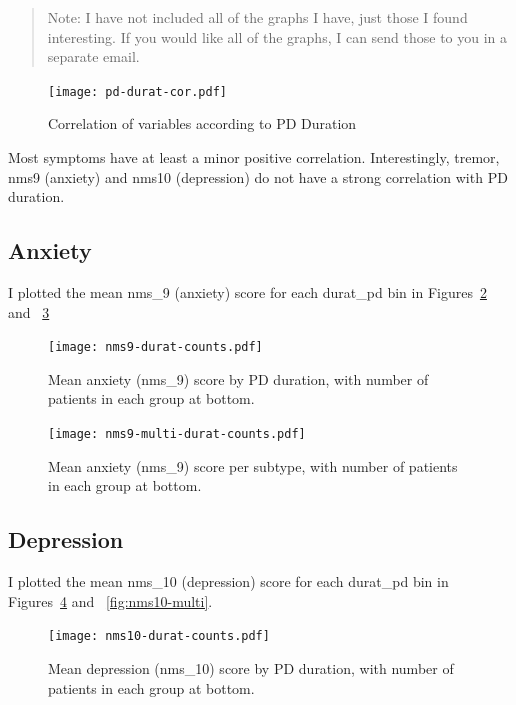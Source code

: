 \documentclass[10pt]{article}
\begin{document}
\begin{multicols}{2}
\begin{quote}
  Note: I have not included all of the graphs I have, just those I found interesting. If you would
  like all of the graphs, I can send those to you in a separate email.
\end{quote}


\begin{figure}[t]
  \centering
  \texttt{[image: pd-durat-cor.pdf]}
  \caption{Correlation of variables according to PD Duration}
  \label{fig:longcorr}
\end{figure}

Most symptoms have at least a minor positive correlation. Interestingly, tremor, nms9 (anxiety)
and nms10 (depression) do not have a strong correlation with PD duration.

\subsection{Anxiety}
I plotted the mean nms\_9 (anxiety) score for each durat\_pd bin in
Figures~\ref{fig:nms9-long} and ~\ref{fig:nms9-multi}

\begin{figure}[p]
  \centering
  \texttt{[image: nms9-durat-counts.pdf]}
  \caption{Mean anxiety (nms\_9) score by PD duration, with number of patients in each group at
  bottom.}
  \label{fig:nms9-long}
\end{figure}

\begin{figure}[p]
  \centering
  \texttt{[image: nms9-multi-durat-counts.pdf]}
  \caption{Mean anxiety (nms\_9) score per subtype, with number of patients in each group at
  bottom.}
  \label{fig:nms9-multi}
\end{figure}

\subsection{Depression}
I plotted the mean nms\_10 (depression) score for each durat\_pd bin in
Figures~\ref{fig:nms10-long} and ~\ref{fig:nms10-multi}.

\begin{figure}[p]
  \centering
  \texttt{[image: nms10-durat-counts.pdf]}
  \caption{Mean depression (nms\_10) score by PD duration, with number of patients in each group at
  bottom.}
  \label{fig:nms10-long}
\end{figure}


\end{multicols}
\end{document}
